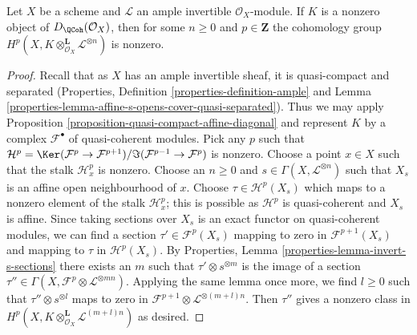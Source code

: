 \begin{lemma}
\label{lemma-nonzero-some-cohomology}
Let $X$ be a scheme and $\mathcal{L}$ an ample invertible
$\mathcal{O}_X$-module. If $K$ is a nonzero object of
$D_\QCoh(\mathcal{O}_X)$, then for some $n \geq 0$ and $p \in \mathbf{Z}$
the cohomology group
$H^p(X, K \otimes_{\mathcal{O}_X}^\mathbf{L} \mathcal{L}^{\otimes n})$
is nonzero.
\end{lemma}

\begin{proof}
Recall that as $X$ has an ample invertible sheaf, it is quasi-compact
and separated (Properties, Definition \ref{properties-definition-ample} and
Lemma \ref{properties-lemma-affine-s-opens-cover-quasi-separated}).
Thus we may apply
Proposition \ref{proposition-quasi-compact-affine-diagonal}
and represent $K$ by a complex $\mathcal{F}^\bullet$ of
quasi-coherent modules. Pick any $p$ such that
$\mathcal{H}^p = \Ker(\mathcal{F}^p \to \mathcal{F}^{p + 1})/
\Im(\mathcal{F}^{p - 1} \to \mathcal{F}^p)$ is nonzero.
Choose a point $x \in X$ such that the stalk $\mathcal{H}^p_x$ is
nonzero. Choose an $n \geq 0$ and $s \in \Gamma(X, \mathcal{L}^{\otimes n})$
such that $X_s$ is an affine open neighbourhood of $x$.
Choose $\tau \in \mathcal{H}^p(X_s)$ which maps to a nonzero
element of the stalk $\mathcal{H}^p_x$; this is possible
as $\mathcal{H}^p$ is quasi-coherent and $X_s$ is affine.
Since taking sections over $X_s$ is an exact functor on
quasi-coherent modules, we can find a section $\tau' \in \mathcal{F}^p(X_s)$
mapping to zero in $\mathcal{F}^{p + 1}(X_s)$ and mapping to
$\tau$ in $\mathcal{H}^p(X_s)$. By
Properties, Lemma \ref{properties-lemma-invert-s-sections}
there exists an $m$ such that $\tau' \otimes s^{\otimes m}$
is the image of a section
$\tau'' \in \Gamma(X, \mathcal{F}^p \otimes \mathcal{L}^{\otimes mn})$.
Applying the same lemma once more, we find $l \geq 0$ such that
$\tau'' \otimes s^{\otimes l}$ maps to zero in
$\mathcal{F}^{p + 1} \otimes \mathcal{L}^{\otimes (m + l)n}$.
Then $\tau''$ gives a nonzero class in
$H^p(X, K \otimes^\mathbf{L}_{\mathcal{O}_X} \mathcal{L}^{(m + l)n})$
as desired.
\end{proof}
